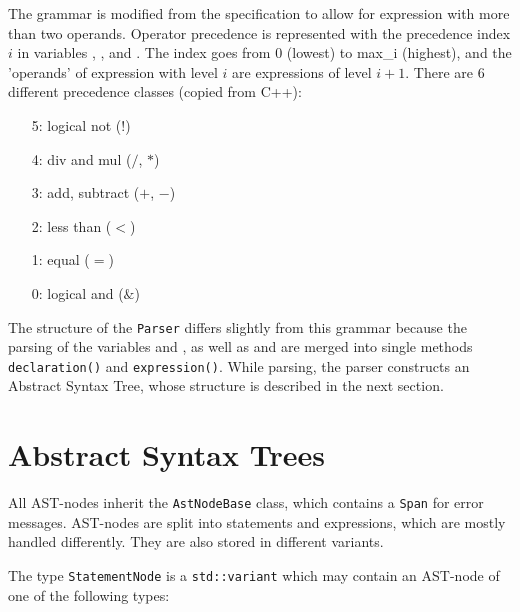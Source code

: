 \documentclass[a4paper]{article}
\newcommand*{\code}[1]{\texttt{#1}}
\begin{document}
The grammar is modified from the specification to allow 
for expression with more than two operands. Operator 
precedence is represented with the precedence index $i$ in 
variables  , ,
 and . The index goes 
from $0$ (lowest) to max\_i (highest), and the 'operands' 
of expression with level $i$ are expressions of level $i+1$.
There are 6 different precedence classes (copied from C++):
\begin{itemize}
  \item[5:] logical not ($!$)
  \item[4:] div and mul ($/$, $*$)
  \item[3:] add, subtract ($+$, $-$)
  \item[2:] less than ($<$)
  \item[1:] equal ($=$)
  \item[0:] logical and ($\&$)
\end{itemize}

The structure of the \code{Parser} differs slightly from this grammar 
because the parsing of the variables  and , as well 
as  and  are merged into single 
methods \code{declaration()} and \code{expression()}.
While parsing, the parser constructs an Abstract Syntax Tree, 
whose structure is described in the next section.

\clearpage
\section{Abstract Syntax Trees}
\label{sect:AST}

All AST-nodes inherit the \code{AstNodeBase} class, which contains 
a \code{Span} for error messages. AST-nodes are split into 
statements and expressions, which are mostly handled differently.
They are also stored in different variants.

The type \code{StatementNode} is a 
\code{std::variant} which may contain an AST-node of one of the 
following types:
\end{document}
